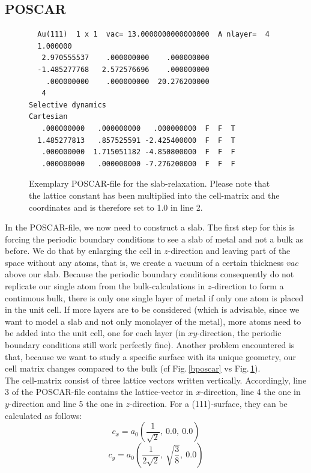 \documentclass[11pt,oneside,a4paper, captions=nooneline, headsepline]{article}%
\begin{document}
\subsection{POSCAR}
\begin{figure}[h!!]
\begin{verbatim}
  Au(111)  1 x 1  vac= 13.0000000000000000  A nlayer=  4
  1.000000
   2.970555537    .000000000    .000000000
  -1.485277768   2.572576696    .000000000
    .000000000    .000000000  20.276200000
   4
Selective dynamics
Cartesian
   .000000000   .000000000   .000000000  F  F  T
  1.485277813   .857525591 -2.425400000  F  F  T
   .000000000  1.715051182 -4.850800000  F  F  F
   .000000000   .000000000 -7.276200000  F  F  F
\end{verbatim}
\caption{Exemplary POSCAR-file for the slab-relaxation. Please note that the lattice constant has been multiplied into the cell-matrix and the coordinates and is therefore set to 1.0 in line 2.}
\label{spos}
\end{figure}
In the POSCAR-file, we now need to construct a slab. The first step for this is forcing the periodic boundary conditions to see a slab of metal and not a bulk as before. We do that by enlarging the cell in $z$-direction and leaving part of the space without any atoms, that is, we create a vacuum of a certain thickness $vac$ above our slab. Because the periodic boundary conditions consequently do not replicate our single atom from the bulk-calculations in $z$-direction to form a continuous bulk, there is only one single layer of metal if only one atom is placed in the unit cell. If more layers are to be considered (which is advisable, since we want to model a slab and not only monolayer of the metal), more atoms need to be added into the unit cell, one for each layer (in $xy$-direction, the periodic boundary conditions still work perfectly fine). Another problem encountered is that, because we want to study a specific surface with its unique geometry, our cell matrix changes compared to the bulk (cf Fig.\,\ref{bposcar} vs Fig.\,\ref{spos}).\\
The cell-matrix consist of three lattice vectors written vertically. Accordingly, line 3 of the POSCAR-file contains the lattice-vector in $x$-direction, line 4 the one in $y$-direction and line 5 the one in $z$-direction. For a (111)-surface, they can be calculated as follows:
\begin{equation}
c_x=a_0\left(\frac{1}{\sqrt{2}}, ~0.0, ~0.0\right)
\end{equation}
\begin{equation}
c_y=a_0\left(\frac{1}{2\sqrt{2}}, ~\sqrt{\frac{3}{8}}, ~0.0\right)
\end{equation}
\end{document}

